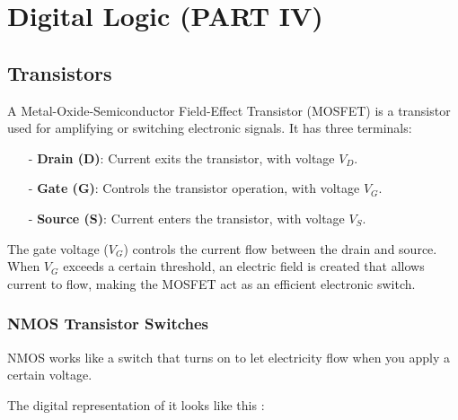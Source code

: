 \documentclass[12pt,openany, tikz,border=10pt]{book}
\begin{document}
			      	\chapter{Digital Logic (PART IV)}
			      	
				
			      	\section{Transistors}
			      	A Metal-Oxide-Semiconductor Field-Effect Transistor (MOSFET) is a transistor used for amplifying or switching electronic signals. It has three terminals:
			      	
			      	\begin{itemize}
			      		\item[-] \textbf{Drain (D)}: Current exits the transistor, with voltage \( V_D\).
			      		\item[-] \textbf{Gate (G)}: Controls the transistor operation, with voltage \( V_G\).
			      		\item[-] \textbf{Source (S)}: Current enters the transistor, with voltage \( V_S\).
			      	\end{itemize}
			      	
			      	
			      	
			      	The gate voltage (\( V_G \)) controls the current flow between the drain and source. When \( V_G \) exceeds a certain threshold, an electric field is created that allows current to flow, making the MOSFET act as an efficient electronic switch.
			      \vspace*{20px}
					\subsection{NMOS Transistor Switches}
			      	\small NMOS works like a switch that turns on to let electricity flow when you apply a certain voltage.
			      	
			      	The digital representation of it looks like this :
			      	
\end{document}
